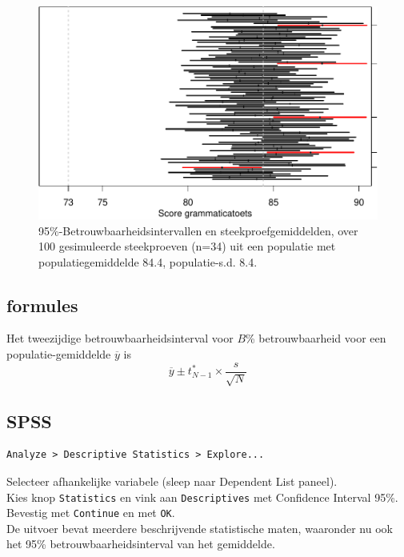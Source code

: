 \documentclass[
]{book}
\begin{document}
\begin{figure}
\centering
\includegraphics{KMS-NL_files/figure-latex/gramm2013CIs-1.pdf}
\caption{\label{fig:gramm2013CIs}95\%-Betrouwbaarheidsintervallen en steekproefgemiddelden, over 100 gesimuleerde steekproeven (n=34) uit een populatie met populatiegemiddelde 84.4, populatie-s.d. 8.4.}
\end{figure}

\hypertarget{sec:formules13-2}{%
\subsection{formules}\label{sec:formules13-2}}

Het tweezijdige betrouwbaarheidsinterval voor \(B\)\% betrouwbaarheid voor
een populatie-gemiddelde \(\overline{y}\) is
\begin{equation}
    \overline{y} \pm t^*_{N-1} \times \frac{s}{\sqrt{N}}
  \label{eq:t-onesampleCI}
\end{equation}

\hypertarget{spss-11}{%
\subsection{SPSS}\label{spss-11}}

\begin{verbatim}
Analyze > Descriptive Statistics > Explore...
\end{verbatim}

Selecteer afhankelijke variabele (sleep naar Dependent List paneel).\\
Kies knop \texttt{Statistics} en vink aan \texttt{Descriptives} met Confidence Interval
95\%.\\
Bevestig met \texttt{Continue} en met \texttt{OK}.\\
De uitvoer bevat meerdere beschrijvende statistische maten, waaronder nu
ook het 95\% betrouwbaarheidsinterval van het gemiddelde.
\end{document}
